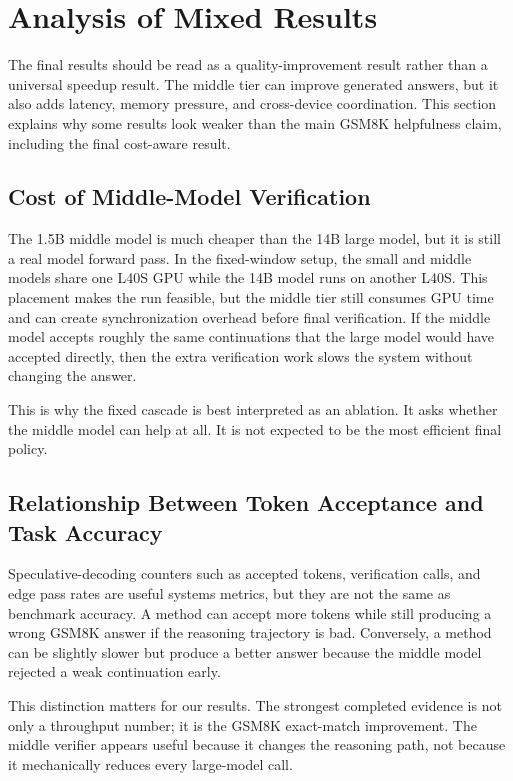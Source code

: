 \documentclass[11pt]{article}
\begin{document}
\section{Analysis of Mixed Results}

The final results should be read as a quality-improvement result rather than a universal speedup result. The middle tier can improve generated answers, but it also adds latency, memory pressure, and cross-device coordination. This section explains why some results look weaker than the main GSM8K helpfulness claim, including the final cost-aware result.

\subsection{Cost of Middle-Model Verification}

The 1.5B middle model is much cheaper than the 14B large model, but it is still a real model forward pass. In the fixed-window setup, the small and middle models share one L40S GPU while the 14B model runs on another L40S. This placement makes the run feasible, but the middle tier still consumes GPU time and can create synchronization overhead before final verification. If the middle model accepts roughly the same continuations that the large model would have accepted directly, then the extra verification work slows the system without changing the answer.

This is why the fixed cascade is best interpreted as an ablation. It asks whether the middle model can help at all. It is not expected to be the most efficient final policy.

\subsection{Relationship Between Token Acceptance and Task Accuracy}

Speculative-decoding counters such as accepted tokens, verification calls, and edge pass rates are useful systems metrics, but they are not the same as benchmark accuracy. A method can accept more tokens while still producing a wrong GSM8K answer if the reasoning trajectory is bad. Conversely, a method can be slightly slower but produce a better answer because the middle model rejected a weak continuation early.

This distinction matters for our results. The strongest completed evidence is not only a throughput number; it is the GSM8K exact-match improvement. The middle verifier appears useful because it changes the reasoning path, not because it mechanically reduces every large-model call.
\end{document}
